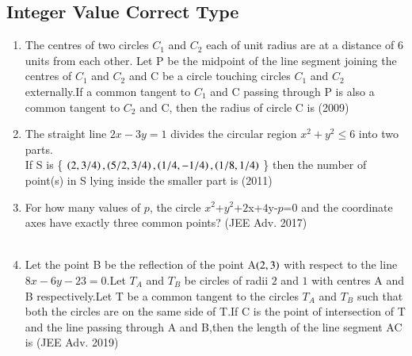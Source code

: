 \documentclass[journal,12pt,twocolumn]{IEEEtran}
\theoremstyle{remark}
\begin{document}
\subsection{Integer Value Correct Type}
\begin{enumerate}
\item The centres of two circles $C_1$ and $C_2$ each of unit radius are at a distance of $6$ units from each other. Let P be the midpoint of the line segment joining the centres of $C_1$ and $C_2$ and C be a circle touching circles $C_1$ and $C_2$ externally.If a common tangent to $C_1$ and C passing through P is also a common tangent to $C_2$ and C, then the radius of circle C is \hfill{(2009)}\\
\item The straight line $2x-3y=1$ divides the circular region $x^2+y^2\leq6$ into two parts.\\
If  S  is \{ $\left(2,3/4\right),\left(5/2,3/4\right),\left(1/4,-1/4\right),\left(1/8,1/4\right)$ \}  then the  number of point(s) in S lying inside the smaller part is \hfill{(2011)}\\
\item For how many values of $p$, the circle $x^2$+$y^2$+$2$x+$4$y-$p$=$0$ and the coordinate axes have exactly three common points? \hfill{(JEE Adv. 2017)}\\
\\
\item Let the point B be the reflection of the point A$\left(2,3\right)$ with respect to the line $8x-6y-23=0$.Let $T_A$ and $T_B$ be circles of radii $2$ and $1$ with centres A and B respectively.Let T be a common tangent to the circles $T_A$ and $T_B$ such that both the circles are on the same side of T.If C is the point of intersection of T and the line passing through A and B,then the length of the line segment AC is \hfill{(JEE Adv. 2019)}
\end{enumerate}
\end{document}
